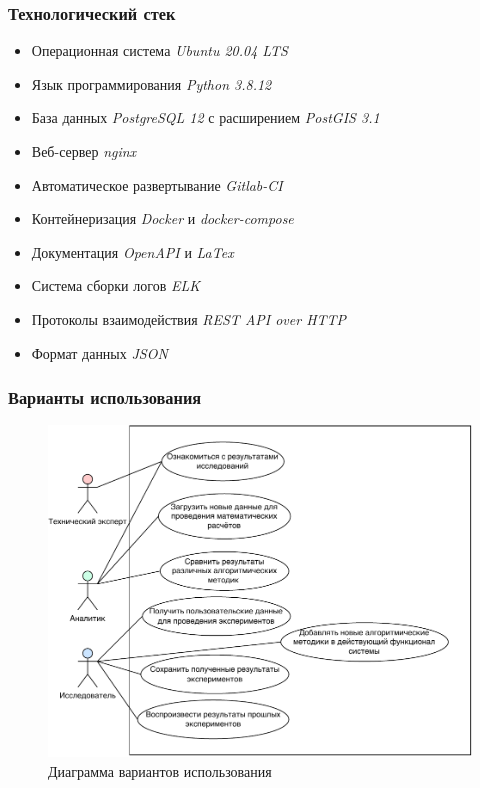 \begin{frame}
\frametitle{Технологический стек}
\begin{itemize}
    \item Операционная система \textit{Ubuntu 20.04 LTS}
    \item Язык программирования \textit{Python 3.8.12}
    \item База данных \textit{PostgreSQL 12} с расширением \textit{PostGIS 3.1}
    \item Веб-сервер \textit{nginx}
    \item Автоматическое развертывание \textit{Gitlab-CI}
    \item Контейнеризация \textit{Docker} и \textit{docker-compose}
    \item Документация \textit{OpenAPI} и \textit{LaTex}
    \item Система сборки логов \textit{ELK}
    \item Протоколы взаимодействия \textit{REST API over HTTP}
    \item Формат данных \textit{JSON}
\end{itemize}
\end{frame}


\begin{frame}
\frametitle{Варианты использования}
\begin{figure}
    \includegraphics[scale=.48]{pictures/analysis/usecase}
    \caption{Диаграмма вариантов использования}
\end{figure}
\end{frame}


